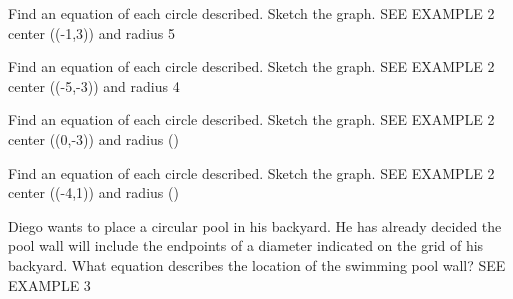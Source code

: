 \documentclass{article}
\newenvironment{practice}[2]{}{}        %
\newcommand{\answer}[1]{}               %
\newcommand{\placeholder}[2]{}          %
\begin{document}
\begin{practice}{21}{2}
Find an equation of each circle described. Sketch the graph. SEE EXAMPLE 2
center ((-1,3)) and radius 5
\answer{((x+1)^2+(y-3)^2=25); see graph.}
\placeholder{graph}{Answer 21: Grid spaced by 2 with black double-arrow x and y axes, O at origin, x window [-10,10], y [-6,14], x labels -8,-4,4,8, y labels -4,4,8,12. Red circle centered at (-1,3), radius 5, extrema (-6,3), (4,3), (-1,-2), (-1,8).}
\end{practice}
\begin{practice}{22}{2}
Find an equation of each circle described. Sketch the graph. SEE EXAMPLE 2
center ((-5,-3)) and radius 4
\answer{((x+5)^2+(y+3)^2=16); see graph.}
\placeholder{graph}{Answer 22: Unit grid with black double-arrow x and y axes, O at origin, window x [-9,1], y [-8,2], x labels -8,-6,-4,-2, y labels -2,-4,-6. Red circle centered at (-5,-3), radius 4, extrema (-9,-3), (-1,-3), (-5,1), (-5,-7).}
\end{practice}
\begin{practice}{23}{2}
Find an equation of each circle described. Sketch the graph. SEE EXAMPLE 2
center ((0,-3)) and radius ()
\answer{(x^2+(y+3)^2=7); see graph.}
\placeholder{graph}{Answer 23: Unit grid with black double-arrow x and y axes, O at origin, window x [-5,5], y [-7,3], x labels -4,-2,2,4, y labels 2,-2,-4,-6. Red circle centered at (0,-3), radius sqrt(7).}
\end{practice}
\begin{practice}{24}{2}
Find an equation of each circle described. Sketch the graph. SEE EXAMPLE 2
center ((-4,1)) and radius ()
\answer{((x+4)^2+(y-1)^2=\frac{9}{4}); see graph.}
\placeholder{graph}{Answer 24: Unit grid with black double-arrow x and y axes, O at origin, window x [-7,3], y [-5,5], x labels -6,-4,-2,2, y labels -4,-2,2,4. Red circle centered at (-4,1), radius 1.5.}
\end{practice}
\begin{practice}{25}{2}
Diego wants to place a circular pool in his backyard. He has already decided the pool wall will include the endpoints of a diameter indicated on the grid of his backyard. What equation describes the location of the swimming pool wall? SEE EXAMPLE 3
\placeholder{diagram}{Backyard illustration with green lawn, stone patio, orange chair, and purple umbrella under a coordinate grid spaced by 2. Black double-arrow x and y axes have no numerical labels. Red circular pool wall has blue center at (3,5) and a blue diameter joining labeled filled endpoints (-3,13) and (9,-3). Radius 10.}
\answer{((x-3)^2+(y-5)^2=100)}
\end{practice}
\end{document}

